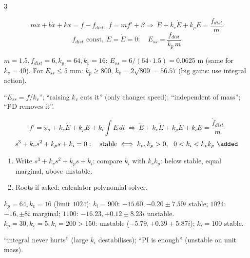 \begin{multicols}{3}
\begin{minipage}{\linewidth}
{}
\end{minipage}
\begin{fbx}
\[m\ddot x+b\dot x+kx=f-f_{dist},\ f=mf'+\beta\Rightarrow\ \ddot E+k_v\dot E+k_pE=\frac{f_{dist}}m\]
\[f_{dist}\text{ const},\ \ddot E{=}\dot E{=}0:\quad E_{ss}=\frac{f_{dist}}{k_p\,m}\]
\end{fbx}
\begin{worked}
$m{=}1.5,f_{dist}{=}6,k_p{=}64,k_v{=}16$: $E_{ss}=6/(64\cdot1.5)=0.0625$ m (same for $k_v=40$). For $E_{ss}\le5$ mm: $k_p\ge800$, $k_v=2\sqrt{800}=56.57$ (big gains: use integral action).
\end{worked}
\begin{trap}
``$E_{ss}=f/k_v$''; ``raising $k_v$ cuts it'' (only changes speed); ``independent of mass''; ``PD removes it''.
\end{trap}
\begin{fbx}
\[f'=\ddot x_d+k_v\dot E+k_pE+k_i\!\int\!E\,dt\ \Rightarrow\ \dddot E+k_v\ddot E+k_p\dot E+k_iE=\frac{\dot f_{dist}}m\]
\[s^3+k_vs^2+k_ps+k_i=0:\quad\text{stable}\iff k_v,k_p>0,\ \ 0<k_i<k_vk_p\ \added\]
\end{fbx}
\begin{recipe}
\begin{enumerate}
\item Write $s^3+k_vs^2+k_ps+k_i$; compare $k_i$ with $k_vk_p$: below stable, equal marginal, above unstable.
\item Roots if asked: calculator polynomial solver.
\end{enumerate}
\end{recipe}
\begin{worked}
$k_p{=}64,k_v{=}16$ (limit $1024$): $k_i{=}900$: $-15.60,-0.20\pm7.59i$ stable; $1024$: $-16,\pm8i$ marginal; $1100$: $-16.23,+0.12\pm8.23i$ unstable. $k_p{=}30,k_v{=}5,k_i{=}200>150$: unstable ($-5.79,+0.39\pm5.87i$); $k_i{=}100$ stable.
\end{worked}
\begin{trap}
``integral never hurts'' (large $k_i$ destabilises); ``PI is enough'' (unstable on unit mass).
\end{trap}


\end{multicols}
